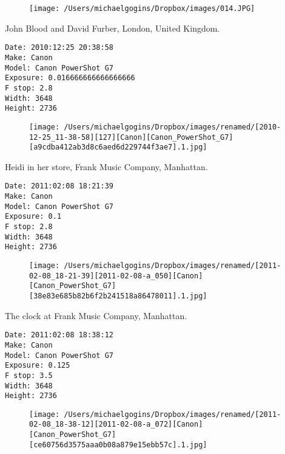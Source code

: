 \documentclass[11pt,letter,DIV=14,paper=landscape]{scrbook}
\begin{document}
\begin{figure}
\texttt{[image: /Users/michaelgogins/Dropbox/images/014.JPG]}
\end{figure}
    
\clearpage
\noindent John Blood and David Furber, London, United Kingdom.
\noindent
\begin{lstlisting}
Date: 2010:12:25 20:38:58
Make: Canon
Model: Canon PowerShot G7
Exposure: 0.016666666666666666
F stop: 2.8
Width: 3648
Height: 2736
\end{lstlisting}
\clearpage

\begin{figure}
\texttt{[image: /Users/michaelgogins/Dropbox/images/renamed/[2010-12-25\_11-38-58][127][Canon][Canon\_PowerShot\_G7][a9cdba412ab3d8c6aed6d229744f3ae7].1.jpg]}
\end{figure}
    
\clearpage
\noindent Heidi in her store, Frank Music Company, Manhattan.
\noindent
\begin{lstlisting}
Date: 2011:02:08 18:21:39
Make: Canon
Model: Canon PowerShot G7
Exposure: 0.1
F stop: 2.8
Width: 3648
Height: 2736
\end{lstlisting}
\clearpage

\begin{figure}
\texttt{[image: /Users/michaelgogins/Dropbox/images/renamed/[2011-02-08\_18-21-39][2011-02-08-a\_050][Canon][Canon\_PowerShot\_G7][38e83e685b82b6f2b241518a86478011].1.jpg]}
\end{figure}
    
\clearpage
\noindent The clock at Frank Music Company, Manhattan.
\noindent
\begin{lstlisting}
Date: 2011:02:08 18:38:12
Make: Canon
Model: Canon PowerShot G7
Exposure: 0.125
F stop: 3.5
Width: 3648
Height: 2736
\end{lstlisting}
\clearpage

\begin{figure}
\texttt{[image: /Users/michaelgogins/Dropbox/images/renamed/[2011-02-08\_18-38-12][2011-02-08-a\_072][Canon][Canon\_PowerShot\_G7][ce60756d3575aaa0b08a879e15ebb57c].1.jpg]}
\end{figure}
    
\end{document}
